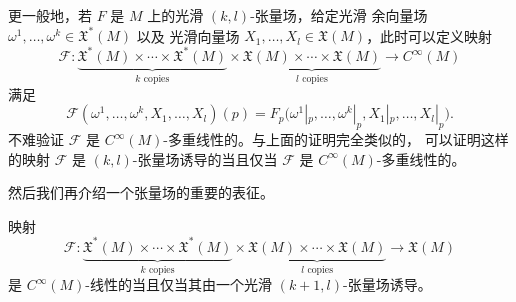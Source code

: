更一般地，若 $F$ 是 $M$ 上的光滑 $(k,l)$-张量场，给定光滑
余向量场 $\omega^1,\dots,\omega^k\in \mathfrak{X}^*(M)$ 以及
光滑向量场 $X_1,\dots,X_l\in \mathfrak{X}(M)$，此时可以定义映射
\[
  \mathcal{F}:\underbrace{\mathfrak{X}^*(M)\times\cdots\times \mathfrak{X}^*(M)}
  _{\text{$k$ copies}}\times \underbrace{\mathfrak{X}(M)\times\cdots\times \mathfrak{X}(M)}
  _{\text{$l$ copies}}\to C^\infty(M)
\]
满足
\[
  \mathcal{F}(\omega^1,\dots,\omega^k,X_1,\dots,X_l)(p)
  =F_p\bigl(\omega^1|_p,\dots,\omega^k|_p,X_1|_p,\dots,X_l|_p\bigr)  .
\]
不难验证 $\mathcal{F}$ 是 $C^\infty(M)$-多重线性的。与上面的证明完全类似的，
可以证明这样的映射 $\mathcal{F}$ 是 $(k,l)$-张量场诱导的当且仅当
$\mathcal{F}$ 是 $C^\infty(M)$-多重线性的。

然后我们再介绍一个张量场的重要的表征。

\begin{lemma}
  映射
  \[
    \mathcal{F}:\underbrace{\mathfrak{X}^*(M)\times\cdots\times \mathfrak{X}^*(M)}
    _{\text{$k$ copies}}\times \underbrace{\mathfrak{X}(M)\times\cdots\times \mathfrak{X}(M)}
    _{\text{$l$ copies}}\to \mathfrak{X}(M)
  \]
  是 $C^\infty(M)$-线性的当且仅当其由一个光滑 $(k+1,l)$-张量场诱导。
\end{lemma}
